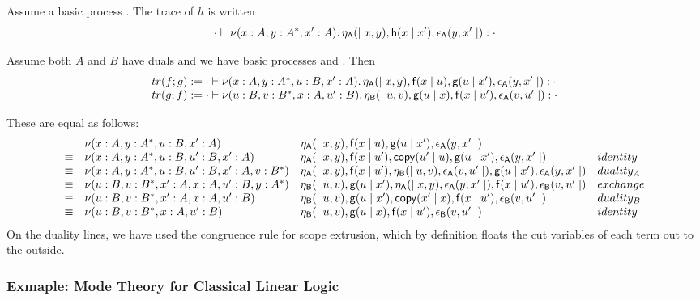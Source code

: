 \documentclass{article}
\newcommand\deq{\ensuremath{\equiv}}
\begin{document}
Assume a basic process .  The trace of $h$ is written
\[
\cdot \vdash \nu (x:A,y:A^*,x':A). \, \mathsf{\eta_A}( \mid x,y),\mathsf{h}(x \mid x'),\mathsf{\epsilon_A}(y,x' \mid ) : \cdot
\]

Assume both $A$ and $B$ have duals and we have basic processes
 and .
Then
\[
\begin{array}{l}
tr(f;g) := \cdot \vdash \nu (x:A,y:A^*,u:B,x':A). \, \mathsf{\eta_A}( \mid x,y),\mathsf{f}(x \mid u),\mathsf{g}(u \mid x'),\mathsf{\epsilon_A}(y,x' \mid ) : \cdot\\
tr(g;f) := \cdot \vdash \nu (u:B,v:B^*,x:A,u':B). \, \mathsf{\eta_B}( \mid u,v),\mathsf{g}(u \mid x),\mathsf{f}(x \mid u'),\mathsf{\epsilon_A}(v,u' \mid ) : \cdot
\end{array}
\]

These are equal as follows:
\[
\begin{array}{llll}
     & \nu {(x:A,y:A^*,u:B,x':A)} & {\const{\eta_A}{}{x,y},\const{f}{x}{u},\const{g}{u}{x'},\const{\epsilon_A}{y,x'}{}} \\
\deq & \nu {(x:A,y:A^*,u:B,u':B,x':A)} & {\const{\eta_A}{}{x,y},\const{f}{x}{u'},\cpy{u'}{u},\const{g}{u}{x'},\const{\epsilon_A}{y,x'}{}} & identity \\
\deq & \nu {(x:A,y:A^*,u:B,u':B,x':A,v:B^*)} & {\const{\eta_A}{}{x,y},\const{f}{x}{u'}, \const{\eta_B}{}{u,v},{\const{\epsilon_A}{v,u'}{}} ,\const{g}{u}{x'},\const{\epsilon_A}{y,x'}{}} & duality_A\\
\deq & \nu {(u:B,v:B^*,x':A,x:A,u':B,y:A^*)} & \const{\eta_B}{}{u,v},\const{g}{u}{x'},\const{\eta_A}{}{x,y},{\const{\epsilon_A}{y,x'}{}},\const{f}{x}{u'},\const{\epsilon_B}{v,u'}{} & exchange \\
\deq & \nu {(u:B,v:B^*,x':A,x:A,u':B)} & \const{\eta_B}{}{u,v},\const{g}{u}{x'},\cpy{x'}{x},\const{f}{x}{u'},\const{\epsilon_B}{v,u'}{} & duality_B \\
\deq & \nu {(u:B,v:B^*,x:A,u':B)} & {\const{\eta_B}{}{u,v},\const{g}{u}{x},\const{f}{x}{u'},\const{\epsilon_B}{v,u'}{}} & identity
\end{array}
\]
On the duality lines, we have used the congruence rule for scope
extrusion, which by definition floats the cut variables of each term out
to the outside.

\subsubsection{Exmaple: Mode Theory for Classical Linear Logic}
\end{document}
